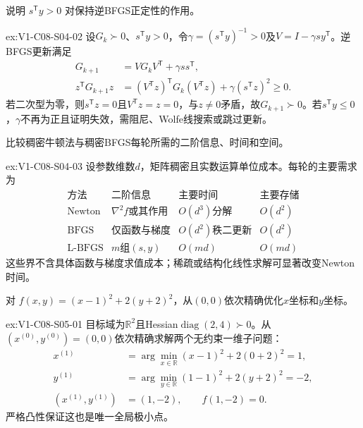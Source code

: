 \begin{SLChapterExercisePairSection}
\begin{exercise}\label{ex:V1-C08-S04-02}
说明 $s^{\mathsf T}y>0$ 对保持逆BFGS正定性的作用。
\end{exercise}
\label{sol:V1-C08-S04-02}
\begin{chapterexercisesolution}{ex:V1-C08-S04-02}
设$G_k\succ0$、$s^{\mathsf T}y>0$，令$\gamma=(s^{\mathsf T}y)^{-1}>0$及$V=I-\gamma s y^{\mathsf T}$。逆BFGS更新满足
\[
\begin{aligned}
G_{k+1}&=VG_kV^{\mathsf T}+\gamma ss^{\mathsf T},\\
z^{\mathsf T}G_{k+1}z
&=(V^{\mathsf T}z)^{\mathsf T}G_k(V^{\mathsf T}z)
+\gamma(s^{\mathsf T}z)^2\ge0.
\end{aligned}
\]
若二次型为零，则$s^{\mathsf T}z=0$且$V^{\mathsf T}z=z=0$，与$z\ne0$矛盾，故$G_{k+1}\succ0$。若$s^{\mathsf T}y\le0$，$\gamma$不再为正且证明失效，需阻尼、Wolfe线搜索或跳过更新。
\end{chapterexercisesolution}

\begin{exercise}\label{ex:V1-C08-S04-03}
比较稠密牛顿法与稠密BFGS每轮所需的二阶信息、时间和空间。
\end{exercise}
\label{sol:V1-C08-S04-03}
\begin{chapterexercisesolution}{ex:V1-C08-S04-03}
设参数维数$d$，矩阵稠密且实数运算单位成本。每轮的主要需求为
\[
\begin{array}{c|c|c|c}
\text{方法}&\text{二阶信息}&\text{主要时间}&\text{主要存储}\\ \hline
\text{Newton}&\nabla^2f\text{或其作用}&O(d^3)\text{分解}&O(d^2)\\
\text{BFGS}&\text{仅函数与梯度}&O(d^2)\text{秩二更新}&O(d^2)\\
\text{L-BFGS}&m\text{组}(s,y)&O(md)&O(md)
\end{array}
\]
这些界不含具体函数与梯度求值成本；稀疏或结构化线性求解可显著改变Newton时间。
\end{chapterexercisesolution}

\begin{exercise}\label{ex:V1-C08-S05-01}
对 $f(x,y)=(x-1)^2+2(y+2)^2$，从$(0,0)$依次精确优化$x$坐标和$y$坐标。
\end{exercise}
\label{sol:V1-C08-S05-01}
\begin{chapterexercisesolution}{ex:V1-C08-S05-01}
目标域为$\mathbb R^2$且Hessian$\operatorname{diag}(2,4)\succ0$。从$(x^{(0)},y^{(0)})=(0,0)$依次精确求解两个无约束一维子问题：
\[
\begin{aligned}
x^{(1)}
&=\arg\min_{x\in\mathbb R}(x-1)^2+2(0+2)^2=1,\\
y^{(1)}
&=\arg\min_{y\in\mathbb R}(1-1)^2+2(y+2)^2=-2,\\
(x^{(1)},y^{(1)})&=(1,-2),\qquad f(1,-2)=0.
\end{aligned}
\]
严格凸性保证这也是唯一全局极小点。
\end{chapterexercisesolution}


\end{SLChapterExercisePairSection}
